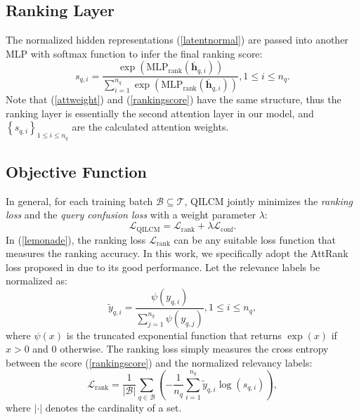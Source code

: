 \documentclass[letterpaper]{article}
\begin{document}
\subsection{Ranking Layer}

The normalized hidden representations (\ref{latentnormal}) are passed into another MLP with softmax function to infer the final ranking score:
\begin{equation}
\label{rankingscore}
{{s}_{q,i}}=\frac{\exp \left( \text{ML}{{\text{P}}_{\text{rank}}}\left( {{\overline{\mathbf{h}}}_{q,i}} \right) \right)}{\sum\limits_{i=1}^{{{n}_{q}}}{\exp \left( \text{ML}{{\text{P}}_{\text{rank}}}\left( {{\overline{\mathbf{h}}}_{q,i}} \right) \right)}},1\le i\le {{n}_{q}}.
\end{equation}
Note that (\ref{attweight}) and (\ref{rankingscore}) have the same structure, thus the ranking layer is essentially the second attention layer in our model, and ${{\left\{ {{s}_{q,i}} \right\}}_{1\le i\le {{n}_{q}}}}$ are the calculated attention weights.

\subsection{Objective Function}

In general, for each training batch $\mathcal{B}\subseteq \mathcal{T}$, QILCM jointly minimizes the \textit{ranking loss} and the \textit{query confusion loss} with a weight parameter $\lambda$:
\begin{equation}
\label{lemonade}
{{\mathcal{L}}_{\text{QILCM}}}={{\mathcal{L}}_{\text{rank}}}+\lambda {{\mathcal{L}}_{\text{conf}}}.
\end{equation}
In (\ref{lemonade}), the ranking loss $ {\mathcal{L}}_{\text{rank}} $ can be any suitable loss function that measures the ranking accuracy. In this work, we specifically adopt the AttRank loss proposed in \cite{ai2018learning} due to its good performance. Let the relevance labels be normalized as:
\begin{equation}
\label{labelnormmalization}
{{\widetilde{y}}_{q,i}}=\frac{\psi \left( {{y}_{q,i}} \right)}{\sum\limits_{j=1}^{{{n}_{q}}}{\psi \left( {{y}_{q,j}} \right)}},1\le i\le n_{q},
\end{equation}
where $\psi \left( x  \right)$ is the truncated exponential function that returns $\exp \left( x \right)$ if $x>0$ and 0 otherwise.
The ranking loss simply measures the cross entropy between the score (\ref{rankingscore}) and the normalized relevancy labels:
\begin{equation}
\label{cross entropy}
{{\mathcal{L}}_{\text{rank}}}=\frac{1}{\left| \mathcal{B} \right|}\sum\limits_{q\in \mathcal{B}}{\left( -\frac{1}{{{n}_{q}}}\sum\limits_{i=1}^{{{n}_{q}}}{{{\widetilde{y}}_{q,i}}\log \left( {{s}_{q,i}} \right)} \right)},
\end{equation}
where $\left| \cdot \right|$ denotes the cardinality of a set.
\end{document}
